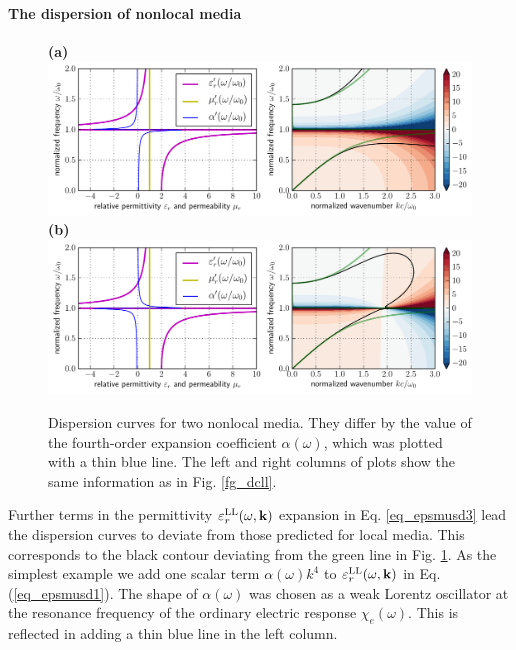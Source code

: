 \paragraph{The dispersion of nonlocal media} %
\begin{figure}[t] \caption{Dispersion curves for two nonlocal media. They differ by the value of the fourth-order expansion coefficient $\alpha(\omega)$, which was plotted with a thin blue line. The left and right columns of plots show the same information as in Fig. \ref{fg_dcll}.  } \label{fg_dcll_nl} \centering  
\textbf{(a)}\\	\includegraphics[width=1\textwidth]{img/dispersion_landau_lifshitz/dispersion_ll_quadrupp.pdf}
\textbf{(b)}\\	\includegraphics[width=1\textwidth]{img/dispersion_landau_lifshitz/dispersion_ll_quadrupn.pdf}
\end{figure}

\label{chap_sd}
Further terms in the permittivity $\varepsilon_r^\text{LL}(\omega,{\mathbf{k}})$ expansion in Eq. \ref{eq_epsmusd3} lead the dispersion curves to deviate from those predicted for local media. This corresponds to the black contour deviating from the green line in Fig. \ref{fg_dcll_nl}.
As the simplest example we add one scalar term $\alpha(\omega) k^4$ to $\varepsilon_r^\text{LL}(\omega,{\mathbf{k}})$ in Eq. (\ref{eq_epsmusd1}). The shape of $\alpha(\omega)$  was chosen as a weak Lorentz oscillator at the resonance frequency of the ordinary electric response $\chi_e(\omega)$. This is reflected in adding a thin blue line in the left column.

